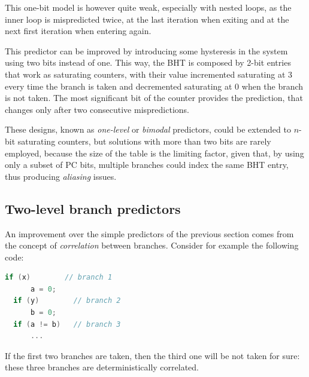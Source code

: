 This one-bit model is however quite weak, especially with nested loops, as the inner loop is mispredicted twice, at the last iteration when exiting and at the next first iteration when entering again.

This predictor can be improved by introducing some hysteresis in the system using two bits instead of one. This way, the \ac{BHT} is composed by 2-bit entries that work as saturating counters, with their value incremented saturating at 3 every time the branch is taken and decremented saturating at 0 when the branch is not taken. The most significant bit of the counter provides the prediction, that changes only after two consecutive mispredictions.

These designs, known as \emph{one-level} or \emph{bimodal} predictors, could be extended to $n$-bit saturating counters, but solutions with more than two bits are rarely employed, because the size of the table is the limiting factor, given that, by using only a subset of \ac{PC} bits, multiple branches could index the same \ac{BHT} entry, thus producing \emph{aliasing} issues.

\subsection{Two-level branch predictors}
An improvement over the simple predictors of the previous section comes from the concept of \emph{correlation} between branches. Consider for example the following code:
\begin{lstlisting}[language=C]
  if (x)        // branch 1
      a = 0;
  if (y)        // branch 2
      b = 0;
  if (a != b)   // branch 3
      ...
\end{lstlisting}
If the first two branches are taken, then the third one will be not taken for sure: these three branches are deterministically correlated.

